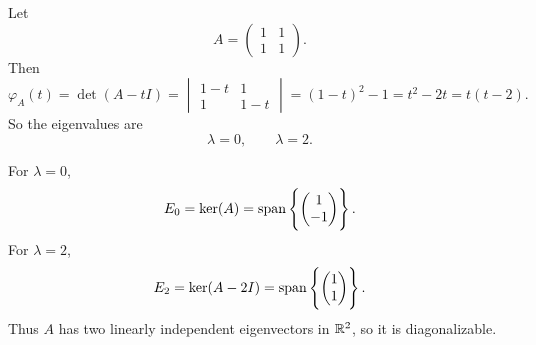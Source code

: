 \documentclass[11pt,openany]{article}
\begin{document}
\begin{example}
Let
\[
A=\begin{pmatrix}1&1\\1&1\end{pmatrix}.
\]
Then
\[
\varphi_A(t)=\det(A-tI)
=\begin{vmatrix}1-t&1\\1&1-t\end{vmatrix}
=(1-t)^2-1
=t^2-2t
=t(t-2).
\]
So the eigenvalues are
\[
\lambda=0,
\qquad
\lambda=2.
\]

For $\lambda=0$,
\[
E_0=\ker(A)=\operatorname{\normalfont span}\left\{\begin{pmatrix}1\\-1\end{pmatrix}\right\}.
\]
For $\lambda=2$,
\[
E_2=\ker(A-2I)=\operatorname{\normalfont span}\left\{\begin{pmatrix}1\\1\end{pmatrix}\right\}.
\]
Thus $A$ has two linearly independent eigenvectors in $\mathbb{R}^2$, so it is diagonalizable.
\end{example}
\end{document}
